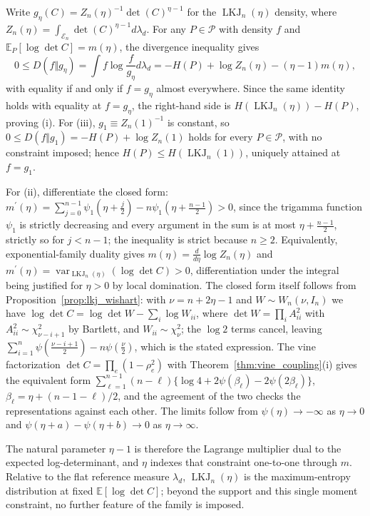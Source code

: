 \documentclass[12pt,english]{article}
\makeatletter
\theoremstyle{plain} %
\theoremstyle{definition} %
\theoremstyle{remark} %
\renewenvironment{proof}[1][\proofname]{\par
  \pushQED{\qed}%
  \normalfont \topsep6\p@\@plus6\p@\relax
  \trivlist
  \item[\hskip\labelsep\bfseries#1:]\ignorespaces
}{%
  \popQED\endtrivlist\@endpefalse
}
\makeatother
\begin{document}
\begin{proof}
Write $g_\eta(C)=Z_n(\eta)^{-1}\det(C)^{\eta-1}$ for the $\operatorname{LKJ}_n(\eta)$ density, where $Z_n(\eta)=\int_{\mathcal{E}_n}\det(C)^{\eta-1}d\lambda_d$. For any $P\in\mathcal{P}$ with density $f$ and $\mathbb{E}_P[\log\det C]=m(\eta)$, the divergence inequality gives
$$
0\leq D(f\Vert g_\eta)=\int f\log\frac{f}{g_\eta}d\lambda_d
=-H(P)+\log Z_n(\eta)-(\eta-1)m(\eta),
$$
with equality if and only if $f=g_\eta$ almost everywhere. Since the same identity holds with equality at $f=g_\eta$, the right-hand side is $H(\operatorname{LKJ}_n(\eta))-H(P)$, proving (i). For (iii), $g_1\equiv Z_n(1)^{-1}$ is constant, so $0\leq D(f\Vert g_1)=-H(P)+\log Z_n(1)$ holds for every $P\in\mathcal{P}$, with no constraint imposed; hence $H(P)\leq H(\operatorname{LKJ}_n(1))$, uniquely attained at $f=g_1$.

For (ii), differentiate the closed form: $m^\prime(\eta)=\sum_{j=0}^{n-1}\psi_1(\eta+\frac{j}{2})-n\psi_1(\eta+\frac{n-1}{2})>0$, since the trigamma function $\psi_1$ is strictly decreasing and every argument in the sum is at most $\eta+\frac{n-1}{2}$, strictly so for $j<n-1$; the inequality is strict because $n\geq2$. Equivalently, exponential-family duality gives $m(\eta)=\frac{d}{d\eta}\log Z_n(\eta)$ and $m^\prime(\eta)=\operatorname{var}_{\operatorname{LKJ}_n(\eta)}(\log\det C)>0$, differentiation under the integral being justified for $\eta>0$ by local domination. The closed form itself follows from Proposition~\ref{prop:lkj_wishart}: with $\nu=n+2\eta-1$ and $W\sim W_n(\nu,I_n)$ we have $\log\det C=\log\det W-\sum_i\log W_{ii}$, where $\det W=\prod_i A_{ii}^2$ with $A_{ii}^2\sim\chi^2_{\nu-i+1}$ by Bartlett, and $W_{ii}\sim\chi^2_\nu$; the $\log2$ terms cancel, leaving $\sum_{i=1}^n\psi(\frac{\nu-i+1}{2})-n\psi(\frac{\nu}{2})$, which is the stated expression. The vine factorization $\det C=\prod_e(1-\rho_e^2)$ \citep{KurowickaCooke:2003} with Theorem~\ref{thm:vine_coupling}(i) gives the equivalent form $\sum_{\ell=1}^{n-1}(n-\ell)\{\log4+2\psi(\beta_\ell)-2\psi(2\beta_\ell)\}$, $\beta_\ell=\eta+(n-1-\ell)/2$, and the agreement of the two checks the representations against each other. The limits follow from $\psi(\eta)\rightarrow-\infty$ as $\eta\rightarrow0$ and $\psi(\eta+a)-\psi(\eta+b)\rightarrow0$ as $\eta\rightarrow\infty$.
\end{proof}

The natural parameter $\eta-1$ is therefore the Lagrange multiplier dual to the expected log-determinant, and $\eta$ indexes that constraint one-to-one through $m$. Relative to the flat reference measure $\lambda_d$, $\operatorname{LKJ}_n(\eta)$ is the maximum-entropy distribution at fixed $\mathbb{E}[\log\det C]$; beyond the support and this single moment constraint, no further feature of the family is imposed.
\end{document}

